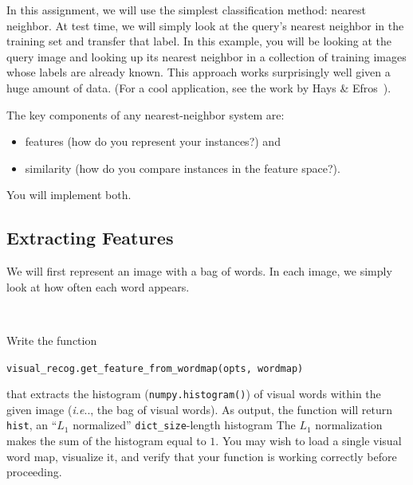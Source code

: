 \documentclass[10pt]{article}
\makeatletter
\DeclareRobustCommand\onedot{\futurelet\@let@token\@onedot}
\def\@onedot{\ifx\@let@token.\else.\null\fi\xspace}
\def\ie{\emph{i.e}\onedot} \def\Ie{\emph{I.e}\onedot}
\makeatother
\begin{document}
In this assignment, we will use the simplest classification method: nearest neighbor.
At test time, we will simply look at the query's nearest neighbor in the training set
and transfer that label. In this example, you will be looking
at the query image and looking up its nearest neighbor in a collection of training images whose labels are already known. This approach works
surprisingly well given a huge amount of data. (For a cool application, see the work by Hays \& Efros~\cite{Hays:2007}). 

The key components of any nearest-neighbor system are:
\begin{itemize}
\item features (how do you represent your instances?) and
\item similarity (how do you compare instances in the feature space?).
\end{itemize} You will implement both.

\subsection{Extracting Features}

We will first represent an image with a bag of words. In each image, we simply look at how often each word appears.
\par ~
\par {}
Write the function
\begin{center}
{\tt visual\_recog.get\_feature\_from\_wordmap(opts, wordmap)}
\end{center}
that extracts the histogram ({\tt numpy.histogram()}) of visual words within the given image
(\ie, the bag of visual words).
As output, the function will return {\tt hist}, an
``$L_1$ normalized'' {\tt dict\_size}-length histogram The $L_1$ normalization makes the sum of the histogram equal to $1$. 
You may wish to load a single visual word map, visualize it, and verify that your function is working correctly before proceeding.
\end{document}
